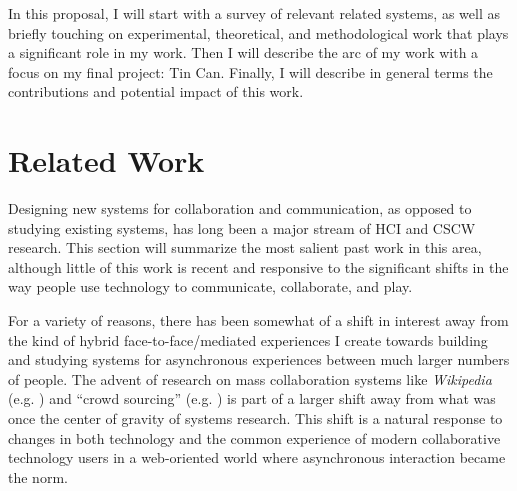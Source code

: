 \documentclass{tufte-handout}
\begin{document}


In this proposal, I will start with a survey of relevant related systems, as well as briefly touching on experimental, theoretical, and methodological work that plays a significant role in my work. Then I will describe the arc of my  work with a focus on my final project: Tin Can. Finally, I will describe in general terms the contributions and potential impact of this work.



\section{Related Work}

Designing new systems for collaboration and communication, as opposed to studying existing systems, has long been a major stream of HCI and CSCW research. This section will summarize the most salient past work in this area, although little of this work is recent and responsive to the significant shifts in the way people use technology to communicate, collaborate, and play. 

For a variety of reasons, there has been somewhat of a shift in interest away from the kind of hybrid face-to-face/mediated experiences I create towards building and studying systems for asynchronous experiences between much larger numbers of people. The advent of research on mass collaboration systems like \emph{Wikipedia} (e.g. \citep{Kittur:2007up}) and ``crowd sourcing'' (e.g. \citep{Bernstein:2010wk}) is part of a larger shift away from what was once the center of gravity of systems research. This shift is a natural response to changes in both technology and the common experience of modern collaborative technology users in a web-oriented world where asynchronous interaction became the norm.
\end{document}
